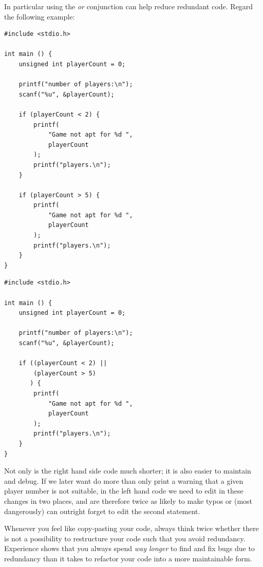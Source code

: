 In particular using the \emph{or} conjunction can help reduce redundant code. Regard the following example:
{
\begin{tcbraster}[raster columns=2,
                  raster equal height,
                  nobeforeafter,
                  raster column skip=0.2cm]
\begin{warnbox}[ifSequence.c, leftupper=7mm]
\begin{verbatim}
#include <stdio.h>

int main () {
    unsigned int playerCount = 0;

    printf("number of players:\n");
    scanf("%u", &playerCount);

    if (playerCount < 2) {
        printf(
            "Game not apt for %d ",
            playerCount
        );
        printf("players.\n");
    }

    if (playerCount > 5) {
        printf(
            "Game not apt for %d ",
            playerCount
        );
        printf("players.\n");
    }
}
\end{verbatim}
\end{warnbox}
%
\begin{codebox}[ifConjunction.c]
\begin{verbatim}
#include <stdio.h>

int main () {
    unsigned int playerCount = 0;

    printf("number of players:\n");
    scanf("%u", &playerCount);

    if ((playerCount < 2) ||
        (playerCount > 5)
       ) {
        printf(
            "Game not apt for %d ",
            playerCount
        );
        printf("players.\n");
    }
}
\end{verbatim}
\end{codebox}
\end{tcbraster}
}

Not only is the right hand side code much shorter; it is also easier to maintain and debug. If we later want do more than only print a warning that a given player number is not suitable, in the left hand code we need to edit in these changes in two places, and are therefore twice as likely to make typos or (most dangerously) can outright forget to edit the second  statement.

\begin{hintbox}
Whenever you feel like copy-pasting your code, always think twice whether there is not a possibility to restructure your code such that you avoid redundancy. Experience shows that you always spend \emph{way longer} to find and fix bugs due to redundancy than it takes to refactor your code into a more maintainable form.
\end{hintbox}

